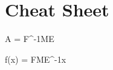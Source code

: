 \chapter{Cheat Sheet}


  \begin{eqbox}
    A = F^{-1}ME
  \end{eqbox}
  \begin{eqbox}
    f(x) = FME^{-1}x
  \end{eqbox}